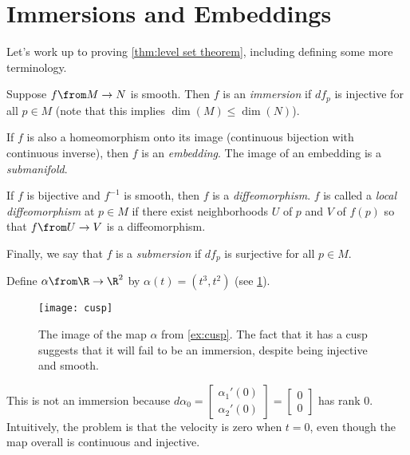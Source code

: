 
\section{Immersions and Embeddings}

Let's work up to proving \cref{thm:level set theorem}, including defining some more terminology.

\begin{definition}\label{def:immersion and embedding}
	Suppose $f \from M \to N$ is smooth. Then $f$ is an \emph{immersion} if $df_p$ is injective for all $p \in M$ (note that this implies $\dim(M) \leq \dim(N)$). 
	
	If $f$ is also a homeomorphism onto its image (continuous bijection with continuous inverse), then $f$ is an \emph{embedding}. The image of an embedding is a \emph{submanifold}. 
	
	If $f$ is bijective and $f^{-1}$ is smooth, then $f$ is a \emph{diffeomorphism}. $f$ is called a \emph{local diffeomorphism} at $p \in M$ if there exist neighborhoods $U$ of $p$ and $V$ of $f(p)$ so that $f \from U \to V$ is a diffeomorphism.
	
	Finally, we say that $f$ is a \emph{submersion} if $df_p$ is surjective for all $p \in M$.
\end{definition}

\begin{example}\label{ex:cusp}
	Define $\alpha \from \R \to \R^2$ by $\alpha(t) = (t^3, t^2)$ (see \cref{fig:cusp}).
	
	\begin{figure}[htbp]
		\centering
			\texttt{[image: cusp]}
		\caption{The image of the map $\alpha$ from \cref{ex:cusp}. The fact that it has a cusp suggests that it will fail to be an immersion, despite being injective and smooth.}
		\label{fig:cusp}
	\end{figure}
	
	This is not an immersion because $d\alpha_0 = \begin{bmatrix} \alpha_1'(0) \\ \alpha_2'(0) \end{bmatrix} = \begin{bmatrix} 0 \\ 0 \end{bmatrix}$ has rank 0. Intuitively, the problem is that the velocity is zero when $t=0$, even though the map overall is continuous and injective.
\end{example}


